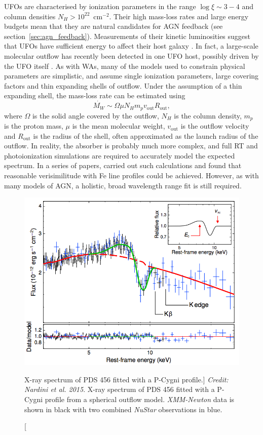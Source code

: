 UFOs are characterised by ionization parameters in the range $\log \xi \sim 3-4$
and column densities $N_H > 10^{22}$~cm$^{-2}$. Their high mass-loss rates
and large energy budgets mean that they are natural candidates for
AGN feedback (see section~\ref{sec:agn_feedback}). Measurements of
their kinetic luminosities suggest that UFOs have sufficient 
energy to affect their host galaxy \citep{gofford2015}. In fact, 
a large-scale molecular outflow has recently been detected in one 
UFO host, possibly driven by the UFO itself \citep{tombesi2015}. 
As with WAs, many of the models
used to constrain physical parameters are simplistic, and assume 
single ionization parameters, large covering factors
and thin expanding shells of outflow.
Under the assumption of a thin expanding shell, 
the mass-loss rate can be estimated using
\citep[e.g.][]{borguet2012}
\begin{equation}
\label{eq:hse}
\dot{M_W} \sim \Omega \mu N_H m_p v_{\mathrm{out}} R_{\mathrm{out}},
\end{equation}
where $\Omega$ is the solid angle covered by the outflow, $N_H$
is the column density, $m_p$ is the proton mass, $\mu$ is the mean molecular weight,
$v_{\mathrm{out}}$ is the outflow velocity
and $R_{\mathrm{out}}$ is the radius of the shell, often approximated as the launch radius
of the outflow. In reality, the absorber is probably much more complex, and full 
RT and photoionization simulations are required to accurately model 
the expected spectrum. 
In a series of papers, 
\cite{simlong2008,sim2010_hydro,sim2010_hydro} carried out such calculations
and found that reasonable verisimilitude with Fe line profiles could be achieved.
However, as with many models of AGN, a holistic, broad wavelength range
fit is still required.

\begin{figure}
\centering
\includegraphics[width=1.0\textwidth]{figures/02-outflows/nardini_pds456.png}
\caption
[X-ray spectrum of PDS 456 fitted with a P-Cygni profile.]
{
{\sl Credit: Nardini et al. 2015}. 
X-ray spectrum of PDS 456 fitted with a P-Cygni profile from a 
spherical outflow model. {\sl XMM-Newton} data is shown in black 
with two combined {\sl NuStar} observations in blue.
} 
\label{fig:nardini}
\end{figure}



